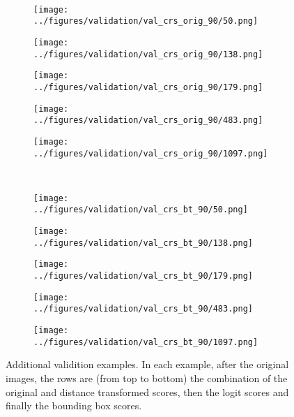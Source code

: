 \begin{figure}[h!]
		\vspace{-0.35cm}
	\\
	\begin{subfigure}{0.19\textwidth}
		\centering
		\texttt{[image: ../figures/validation/val\_crs\_orig\_90/50.png]}
		\label{fig:1}
	\end{subfigure}
	\begin{subfigure}{0.19\textwidth}
		\centering
		\texttt{[image: ../figures/validation/val\_crs\_orig\_90/138.png]}
		\label{fig:1}
	\end{subfigure}
	\begin{subfigure}{0.19\textwidth}
		\centering
		\texttt{[image: ../figures/validation/val\_crs\_orig\_90/179.png]}
		\label{fig:1}
	\end{subfigure}
	\begin{subfigure}{0.19\textwidth}
		\centering
		\texttt{[image: ../figures/validation/val\_crs\_orig\_90/483.png]}
		\label{fig:1}
	\end{subfigure}
	\begin{subfigure}{0.19\textwidth}
		\centering
		\texttt{[image: ../figures/validation/val\_crs\_orig\_90/1097.png]}
		\label{fig:1}
	\end{subfigure}
			\vspace{-0.35cm}
	\\
	\begin{subfigure}{0.19\textwidth}
		\centering
		\texttt{[image: ../figures/validation/val\_crs\_bt\_90/50.png]}
		\label{fig:1}
	\end{subfigure}
	\begin{subfigure}{0.19\textwidth}
		\centering
		\texttt{[image: ../figures/validation/val\_crs\_bt\_90/138.png]}
		\label{fig:1}
	\end{subfigure}
	\begin{subfigure}{0.19\textwidth}
		\centering
		\texttt{[image: ../figures/validation/val\_crs\_bt\_90/179.png]}
		\label{fig:1}
	\end{subfigure}
	\begin{subfigure}{0.19\textwidth}
		\centering
		\texttt{[image: ../figures/validation/val\_crs\_bt\_90/483.png]}
		\label{fig:1}
	\end{subfigure}
	\begin{subfigure}{0.19\textwidth}
		\centering
		\texttt{[image: ../figures/validation/val\_crs\_bt\_90/1097.png]}
		\label{fig:1}
	\end{subfigure}
	\label{fig:grid}
	\caption{Additional validition examples. In each example, after the original images, the rows are (from top to bottom) the combination of the original and distance transformed scores, then the logit scores and finally the bounding box scores.}\label{fig:polpysex2}
\end{figure}

